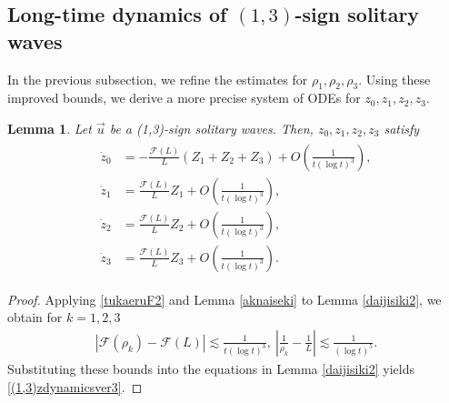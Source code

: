 \documentclass[reqno]{amsart}
\theoremstyle{plain}
\newtheorem{lemma}[theorem]{Lemma}
\theoremstyle{definition}
\numberwithin{equation}{section}
\newcommand{\1}{\mathbbm{1}}
\begin{document}
\subsection{Long-time dynamics of \((1,3)\)-sign solitary waves}
In the previous subsection, we refine the estimates for $\rho_1,\rho_2,\rho_3$. Using these improved bounds, we derive a more precise system of ODEs for $z_0,z_1,z_2,z_3$.
\begin{lemma}\label{Ldehyouka}
Let $\vec{u}$ be a (1,3)-sign solitary waves. Then, $z_0,z_1,z_2,z_3$ satisfy 
\begin{align}\label{(1,3)zdynamicsver3}
\begin{aligned}
\dot{z}_0&=-\frac{\mathcal{F}(L)}{L}(Z_1+Z_2+Z_3)+O\left(\frac{1}{t(\log{t})^{3}}\right),
\\
\dot{z}_1&=\frac{\mathcal{F}(L)}{L}Z_1+O\left(\frac{1}{t(\log{t})^{3}}\right),
\\
\dot{z}_2&=\frac{\mathcal{F}(L)}{L}Z_2+O\left(\frac{1}{t(\log{t})^{3}}\right),
\\
\dot{z}_3&=\frac{\mathcal{F}(L)}{L}Z_3+O\left(\frac{1}{t(\log{t})^{3}}\right).
\end{aligned}
\end{align}
\end{lemma}
\begin{proof}
Applying \eqref{tukaeruF2} and Lemma \ref{aknaiseki} to Lemma \ref{daijisiki2}, we obtain for $k=1,2,3$
\begin{align*}
\left|\mathcal{F}(\rho_k)-\mathcal{F}(L)\right|\lesssim \frac{1}{t(\log{t})^3},\ \left|\frac{1}{\rho_k}-\frac{1}{L}\right|\lesssim \frac{1}{(\log{t})^5}.
\end{align*}
Substituting these bounds into the equations in Lemma \ref{daijisiki2} yields \eqref{(1,3)zdynamicsver3}.
\end{proof}
\end{document}
